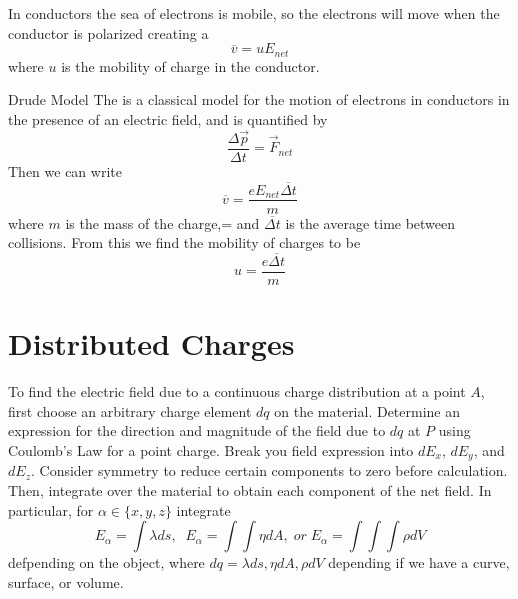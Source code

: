 \documentclass[12pt]{report}
\begin{document}
\begin{defn}{}{}
        In conductors the sea of electrons is mobile, so the electrons will move when the conductor is polarized creating a \begin{equation}
                \overline{v} = uE_{net}
        \end{equation}
        where $u$ is the mobility of charge in the conductor.
\end{defn}

\begin{defn}{Drude Model}{}
        The  is a classical model for the motion of electrons in conductors in the presence of an electric field, and is quantified by \begin{equation}
                \frac{\Delta \vec{p}}{\Delta t} = \vec{F}_{net}
        \end{equation}
        Then we can write \begin{equation}
                \overline{v} = \frac{eE_{net}\overline{\Delta t}}{m}
        \end{equation}
        where $m$ is the mass of the charge,= and $\overline{\Delta t}$ is the average time between collisions. From this we find the mobility of charges to be \begin{equation}
                u = \frac{e\overline{\Delta t}}{m}
        \end{equation}
\end{defn}

\section{Distributed Charges}

\begin{rmk}{}{}
        To find the electric field due to a continuous charge distribution at a point $A$, first choose an arbitrary charge element $dq$ on the material. Determine an expression for the direction and magnitude of the field due to $dq$ at $P$ using Coulomb's Law for a point charge. Break you field expression into $dE_x$, $dE_y$, and $dE_z$. Consider symmetry to reduce certain components to zero before calculation. Then, integrate over the material to obtain each component of the net field. In particular, for $\alpha \in \{x,y,z\}$ integrate \begin{equation}
                E_{\alpha} = \int\lambda ds,\;\;E_{\alpha} = \int\int\eta dA,\;or\;E_{\alpha} = \int\int\int\rho dV
        \end{equation}
        defpending on the object, where $dq = \lambda ds, \eta dA, \rho dV$ depending if we have a curve, surface, or volume.
\end{rmk}
\end{document}
